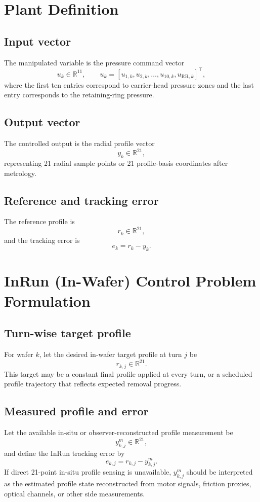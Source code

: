 \documentclass[11pt,a4paper]{article}
\newcommand{\R}{\mathbb{R}}
\begin{document}
\section{Plant Definition}
\subsection{Input vector}
The manipulated variable is the pressure command vector
\[
u_k\in\R^{11},\qquad u_k=[u_{1,k},u_{2,k},\dots,u_{10,k},u_{\mathrm{RR},k}]^\top,
\]
where the first ten entries correspond to carrier-head pressure zones and the last entry corresponds to the retaining-ring pressure.

\subsection{Output vector}
The controlled output is the radial profile vector
\[
y_k\in\R^{21},
\]
representing 21 radial sample points or 21 profile-basis coordinates after metrology.

\subsection{Reference and tracking error}
The reference profile is
\[
r_k\in\R^{21},
\]
and the tracking error is
\[
e_k=r_k-y_k.
\]

\section{InRun (In-Wafer) Control Problem Formulation}
\subsection{Turn-wise target profile}
For wafer $k$, let the desired in-wafer target profile at turn $j$ be
\[
r_{k,j}\in\R^{21}.
\]
This target may be a constant final profile applied at every turn, or a scheduled profile trajectory that reflects expected removal progress.

\subsection{Measured profile and error}
Let the available in-situ or observer-reconstructed profile measurement be
\[
y^m_{k,j}\in\R^{21},
\]
and define the InRun tracking error by
\[
e_{k,j}=r_{k,j}-y^m_{k,j}.
\]
If direct 21-point in-situ profile sensing is unavailable, $y^m_{k,j}$ should be interpreted as the estimated profile state reconstructed from motor signals, friction proxies, optical channels, or other side measurements.
\end{document}
